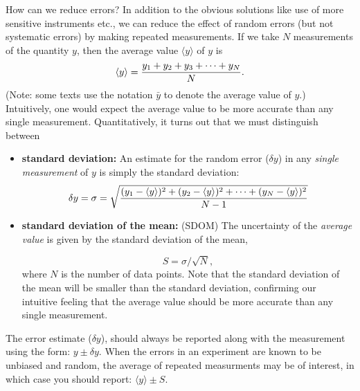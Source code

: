      How can we reduce errors?  In addition to the obvious
solutions like  use of more sensitive instruments
etc., we can reduce the effect of random errors (but not systematic errors)
by making repeated
measurements.  If we take $N$ measurements of the quantity
$y$, then the average value $\langle y \rangle$ of $y$ is
\[
\langle y \rangle = {{y_{1} + y_{2} + y_{3} + \cdots + y_{N}} \over
{N}}.
\]
(Note: some texts use the notation $\bar{y}$ to denote
the average value of $y$.)
Intuitively, one would expect the average value to be more accurate
than any single measurement.  Quantitatively, it turns out that we
must distinguish between

\begin{itemize}
\item {\bf standard deviation:} An estimate for the random error
($\delta y$) in any {\em single measurement} of $y$ is simply the
standard deviation:
\[
\delta y = \sigma = \sqrt{{{(y_{1} - \langle y \rangle)^{2} +
   (y_{2} - \langle y \rangle)^{2} + \cdots +(y_{N} - \langle y \rangle)^{2}}
    \over {N - 1}}}
\]

\item {\bf standard deviation of the mean:} (SDOM) The uncertainty of the
{\em average value} is given by the standard deviation
of the mean, \label{sdev.mean}


\[
S = \sigma / \sqrt{N},
\]
where $N$ is the number of data points.  Note that the standard
deviation of the mean will be smaller than the standard deviation,
confirming our intuitive feeling that the average value should be more
accurate than any single measurement.
\end{itemize}

     The error estimate ($\delta y$), should always be reported along
with the measurement using the form: $y \pm \delta y$.
When  the errors in an experiment are known to be unbiased and random,
the average of repeated measurments may be of interest, in which case
you should report:
$\langle y \rangle \pm S$.


